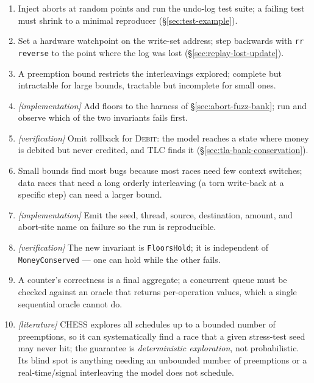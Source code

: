 \begin{enumerate}
    \item Inject aborts at random points and run the undo-log test suite;
          a failing test must shrink to a minimal reproducer
          (\S\ref{sec:test-example}).
    \item Set a hardware watchpoint on the write-set address; step backwards
          with \texttt{rr reverse} to the point where the log was lost
          (\S\ref{sec:replay-lost-update}).
    \item A preemption bound restricts the interleavings explored; complete
          but intractable for large bounds, tractable but incomplete for
          small ones.
    \item \emph{[implementation]} Add floors to the harness of
          \S\ref{sec:abort-fuzz-bank}; run and observe which of the two
          invariants fails first.
    \item \emph{[verification]} Omit rollback for \textsc{Debit}: the model
          reaches a state where money is debited but never credited, and
          TLC finds it (\S\ref{sec:tla-bank-conservation}).
    \item Small bounds find most bugs because most races need few context
          switches; data races that need a long orderly interleaving (a
          torn write-back at a specific step) can need a larger bound.
    \item \emph{[implementation]} Emit the seed, thread, source, destination,
          amount, and abort-site name on failure so the run is
          reproducible.
    \item \emph{[verification]} The new invariant is \texttt{FloorsHold};
          it is independent of \texttt{MoneyConserved} --- one can hold
          while the other fails.
    \item A counter's correctness is a final aggregate; a concurrent queue
          must be checked against an oracle that returns per-operation
          values, which a single sequential oracle cannot do.
    \item \emph{[literature]} CHESS explores all schedules up to a bounded
          number of preemptions, so it can systematically find a race that
          a given stress-test seed may never hit; the guarantee is
          \emph{deterministic exploration}, not probabilistic.  Its blind
          spot is anything needing an unbounded number of preemptions or a
          real-time/signal interleaving the model does not schedule.
\end{enumerate}

